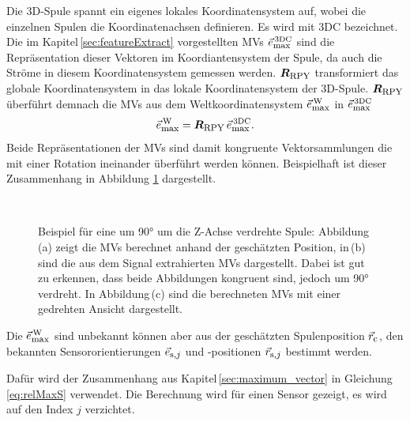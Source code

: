Die 3D-Spule spannt ein eigenes lokales Koordinatensystem auf, wobei die einzelnen Spulen die Koordinatenachsen definieren. Es wird mit 3DC bezeichnet. Die im Kapitel\,\ref{sec:featureExtract} vorgestellten MVs $\vec{e}_{\textrm{\footnotesize{max}}}^{\,\text{3DC}}$ sind die Repräsentation dieser Vektoren im Koordiantensystem der Spule, da auch die Ströme in diesem Koordinatensystem gemessen werden. $\mbox{\boldmath ${R}$}_{\textrm{\footnotesize{RPY}}}$ transformiert das globale Koordinatensystem in das lokale Koordinatensystem der 3D-Spule. $\mbox{\boldmath ${R}$}_{\textrm{\footnotesize{RPY}}}$ überführt demnach die MVs aus dem Weltkoordinatensystem $\vec{e}_{\textrm{\footnotesize{max}}}^{\,\text{W}}$ in $\vec{e}_{\textrm{\footnotesize{max}}}^{\,\text{3DC}}$ 
\begin{equation}
    \vec{e}_{\textrm{\footnotesize{max}}}^{\,\text{W}} = \mbox{\boldmath ${R}$}_{\textrm{\footnotesize{RPY}}} \, \vec{e}_{\textrm{\footnotesize{max}}}^{\,\text{3DC}}.
    \label{eq:RotMaxvecs}
\end{equation}
Beide Repräsentationen der MVs sind damit kongruente Vektorsammlungen die mit einer Rotation ineinander überführt werden können. Beispielhaft ist dieser Zusammenhang in Abbildung \ref{fig:Kongruent} dargestellt.

\begin{figure}
    \centering
    \\
    \caption{Beispiel für eine um 90° um die Z-Achse verdrehte Spule: Abbildung\,(a) zeigt die MVs berechnet anhand der geschätzten Position, in\,(b) sind die aus dem Signal extrahierten MVs dargestellt. Dabei ist gut zu erkennen, dass beide Abbildungen kongruent sind, jedoch um 90° verdreht. In Abbildung\,(c) sind die berechneten MVs mit einer gedrehten Ansicht dargestellt.}
    \label{fig:Kongruent}
\end{figure}
  
Die $\vec{e}_{\textrm{\footnotesize{max}}}^{\,\text{W}}$ sind unbekannt können aber aus der geschätzten Spulenposition $\vec{r}_{\textrm{\footnotesize{c}}}$, den bekannten Sensororientierungen $\vec{e}_{\textrm{\footnotesize{s,$j$}}}$ und -positionen $\vec{r}_{\textrm{\footnotesize{s,$j$}}}$ bestimmt werden.

Dafür wird der Zusammenhang aus Kapitel\,\ref{sec:maximum_vector} in Gleichung\,\ref{eq:relMaxS} verwendet. Die Berechnung wird für einen Sensor gezeigt, es wird auf den Index $j$ verzichtet.

